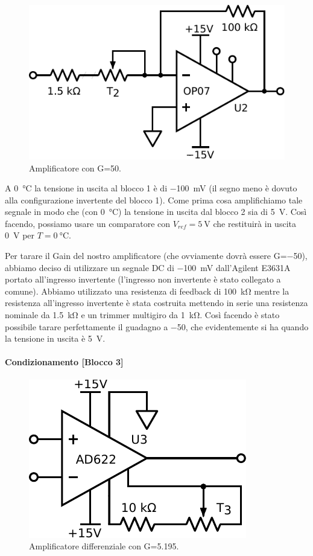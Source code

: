 \begin{figure}
\centering
\includegraphics[width=.3\textwidth]{../E06/latex/P2.pdf}
\caption{Amplificatore con G=50.}
\label{cir6:blocco2}
\end{figure}

A \SI{0}{\celsius} la tensione in uscita al blocco 1 è di \SI{-100}{\mV} (il segno meno è dovuto alla configurazione invertente del blocco 1).
Come prima cosa amplifichiamo tale segnale in modo che (con \SI{0}{\celsius}) la tensione in uscita dal blocco 2 sia di \SI{5}{\volt}.
Così facendo, possiamo usare un comparatore con $V_{ref}=\SI{5}{\volt}$ che restituirà in uscita \SI{0}{\volt} per $T=\SI{0}{\celsius}$.

Per tarare il Gain del nostro amplificatore (che ovviamente dovrà essere G=\num{-50}), abbiamo deciso di utilizzare un segnale DC di \SI{-100}{\mV} dall'Agilent E3631A portato all'ingresso invertente (l'ingresso non invertente è stato collegato a comune).
Abbiamo utilizzato una resistenza di feedback di \SI{100}{\kilo\ohm} mentre la resistenza all'ingresso invertente è stata costruita mettendo in serie una resistenza nominale da \SI{1.5}{\kilo\ohm} e un trimmer multigiro da \SI{1}{\kilo\ohm}.
Così facendo è stato possibile tarare perfettamente il guadagno a \num{-50}, che evidentemente si ha quando la tensione in uscita è \SI{5}{\volt}. 

\paragraph{Condizionamento [Blocco 3]\newline}

\begin{figure}
\centering
\includegraphics[width=.27\textwidth]{../E06/latex/P3.pdf}
\caption{Amplificatore differenziale con G=5.195.}
\label{cir6:blocco3}
\end{figure}

